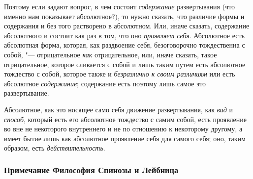 Поэтому если задают вопрос, в чем состоит
{\em содержание} развертывания (что именно нам
показывает абсолютное?), то нужно сказать, что различие формы и содержания
и без того растворено в абсолютном. Или, иначе сказать, содержание
абсолютного и состоит как раз в том, что оно
{\em проявляет себя}. Абсолютное есть абсолютная форма,
которая, как раздвоение себя, безоговорочно тождественна с собой, "---
отрицательное {\em как} отрицательное, или, иначе
сказать, такое отрицательное, которое сливается с собой и лишь таким путем
есть абсолютное тождество с собой, которое также и
{\em безразлично к своим различиям} или есть абсолютное
{\em содержание}; содержание есть поэтому лишь самое
это развертывание.

Абсолютное, как это носящее само себя движение развертывания, как
{\em вид} и {\em способ}, который
есть его абсолютное тождество с самим собой, есть проявление во вне не
некоторого внутреннего и не по отношению к некоторому другому, а имеет
бытие лишь как абсолютное проявление себя для самого себя; оно, таким
образом, есть {\em действительность}.


\subsubsection[Примечание Философия Спинозы и Лейбница]
{Примечание Философия Спинозы и Лейбница}

